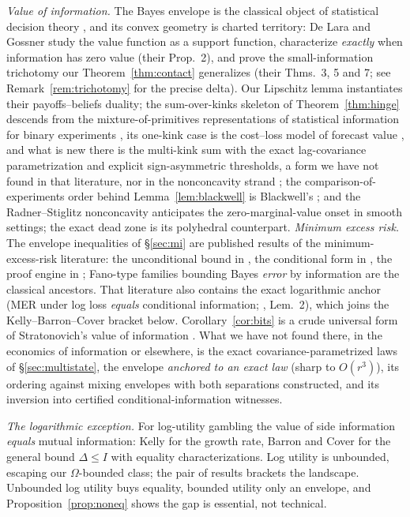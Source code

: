 \documentclass[acmsmall,screen,review,anonymous]{acmart}
\begin{document}
\emph{Value of information.} The Bayes envelope is the classical object of
statistical decision theory \cite{howard1966,raiffa61}, and its convex
geometry is charted territory: De Lara and Gossner \cite{delaragossner}
study the value function as a support function, characterize
\emph{exactly} when information has zero value (their Prop.~2), and prove
the small-information trichotomy our Theorem~\ref{thm:contact}
generalizes (their Thms.~3, 5 and 7; see Remark~\ref{rem:trichotomy} for the
precise delta). Our Lipschitz lemma instantiates their payoffs--beliefs
duality; the sum-over-kinks skeleton of Theorem~\ref{thm:hinge} descends
from the mixture-of-primitives representations of statistical information
for binary experiments \cite{schervish89,reidwilliamson11}, its one-kink
case is the cost--loss model of forecast value \cite{murphy77,richardson00},
and what is new there is the multi-kink sum with the exact lag-covariance
parametrization and explicit
sign-asymmetric thresholds, a form we have not found in that
literature, nor in the nonconcavity strand
\cite{radnerstiglitz84,chadeschlee02,delaragilotte07,whitmeyer25}; the comparison-of-experiments order behind
Lemma~\ref{lem:blackwell} is Blackwell's \cite{blackwell53}; and the
Radner--Stiglitz nonconcavity \cite{radnerstiglitz84,chadeschlee02}
anticipates the zero-marginal-value onset in smooth settings; the exact
dead zone is its polyhedral counterpart. \emph{Minimum excess risk.} The envelope inequalities of
\S\ref{sec:mi} are published results of the minimum-excess-risk
literature: the unconditional bound in \cite{makhdoumi14,gyorfi23,xu20},
the conditional form in \cite{hafezkolahi21,xuraginsky22}, the proof
engine in \cite{russo16}; Fano-type families bounding Bayes \emph{error}
by information are the classical ancestors. That literature also
contains the exact logarithmic anchor (MER under log loss \emph{equals}
conditional information; \cite{xuraginsky22}, Lem.~2), which joins the
Kelly--Barron--Cover bracket below. Corollary~\ref{cor:bits} is a crude
universal form of Stratonovich's value of information \cite{stratonovich}.
What we have not found there, in the
economics of information or elsewhere, is the exact covariance-parametrized laws of \S\ref{sec:multistate},
the envelope \emph{anchored to an exact law} (sharp to $O(r^3)$), its ordering against mixing
envelopes with both separations constructed, and its inversion into
certified conditional-information witnesses.

\emph{The logarithmic exception.} For log-utility gambling the value of
side information \emph{equals} mutual information: Kelly \cite{kelly56}
for the growth rate, Barron and Cover \cite{barroncover88} for the general
bound $\Delta\le I$ with equality characterizations. Log utility is
unbounded, escaping our $\Omega$-bounded class; the pair of results
brackets the landscape. Unbounded log utility buys equality, bounded
utility only an envelope, and Proposition~\ref{prop:noneq} shows the gap is
essential, not technical.
\end{document}
